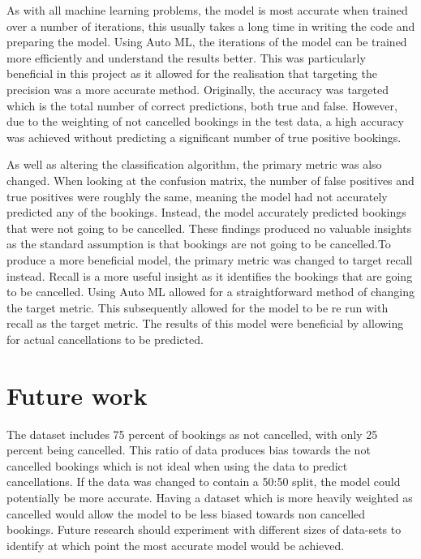 \vspace{5mm}

As with all machine learning problems, the model is most accurate when trained over a number of iterations, this usually takes a long time in writing the code and preparing the model. Using Auto ML, the iterations of the model can be trained more efficiently and understand the results better. This was particularly beneficial in this project as it allowed for the realisation that targeting the precision was a more accurate method. Originally, the accuracy was targeted which is the total number of correct predictions, both true and false. However, due to the weighting of not cancelled bookings in the test data, a high accuracy was achieved without predicting a significant number of true positive bookings. 

\vspace{5mm}

As well as altering the classification algorithm, the primary metric was also changed. When looking at the confusion matrix, the number of false positives and true positives were roughly the same, meaning the model had not accurately predicted any of the bookings. Instead, the model accurately predicted bookings that were not going to be cancelled. These findings produced no valuable insights as the standard assumption is that bookings are not going to be cancelled.To produce a more beneficial model, the primary metric was changed to target recall instead. Recall is a more useful insight as it identifies the bookings that are going to be cancelled. Using Auto ML allowed for a straightforward method of changing the target metric. This subsequently allowed for the model to be re run with recall as the target metric. The results of this model were beneficial by allowing for actual cancellations to be predicted. 

\section{Future work}
The dataset includes 75 percent of bookings as not cancelled, with only 25 percent being cancelled. This ratio of data produces bias towards the not cancelled bookings which is not ideal when using the data to predict cancellations. If the data was changed to contain a 50:50 split, the model could potentially be more accurate. Having a dataset which is more heavily weighted as cancelled would allow the model to be less biased towards non cancelled bookings. Future research should experiment with different sizes of data-sets to identify at which point the most accurate model would be achieved. 

